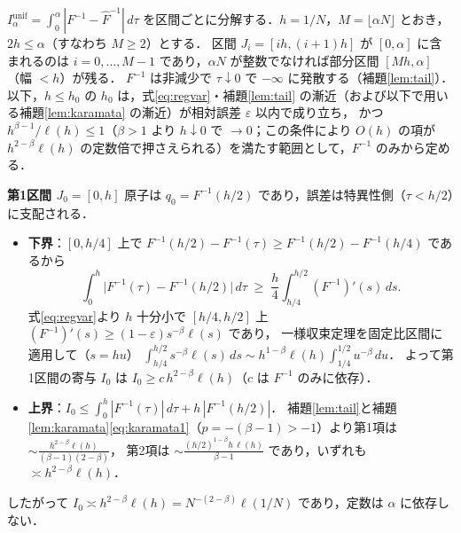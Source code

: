 \documentclass[a4paper,10pt]{jsarticle}
\makeatletter
\theoremstyle{definition}
\renewenvironment{proof}[1][\proofname]{\par
  \pushQED{\qed}%
  \normalfont \topsep6\p@\@plus6\p@\relax
  \trivlist
  \item[\hskip\labelsep\textbf{#1}]\ignorespaces
}{%
  \popQED\endtrivlist\@endpefalse
}
\renewcommand{\proofname}{証明}
\newcommand{\Finv}{F^{-1}}
\newcommand{\Fhinv}{\hat{F}^{-1}}
\newcommand{\Iunif}{I_\alpha^{\mathrm{unif}}}
\makeatother
\begin{document}
\begin{proof}
$\Iunif=\int_0^\alpha|\Finv-\Fhinv|\,d\tau$ を区間ごとに分解する．$h=1/N$，$M=\lfloor\alpha N\rfloor$ とおき，$2h\le\alpha$（すなわち $M\ge2$）とする．
区間 $J_i=[ih,(i+1)h]$ が $[0,\alpha]$ に含まれるのは $i=0,\dots,M-1$ であり，$\alpha N$ が整数でなければ部分区間 $[Mh,\alpha]$（幅 $<h$）が残る．
$\Finv$ は非減少で $\tau\downarrow0$ で $-\infty$ に発散する（補題\ref{lem:tail}）．
以下，$h\le h_0$ の $h_0$ は，式\eqref{eq:regvar}・補題\ref{lem:tail} の漸近（および以下で用いる補題\ref{lem:karamata} の漸近）が相対誤差 $\varepsilon$ 以内で成り立ち，
かつ $h^{\beta-1}/\ell(h)\le1$（$\beta>1$ より $h\downarrow0$ で $\to0$；この条件により $O(h)$ の項が $h^{2-\beta}\ell(h)$ の定数倍で押さえられる）を満たす範囲として，$\Finv$ のみから定める．

\noindent\textbf{第1区間 $J_0=[0,h]$}
原子は $q_0=\Finv(h/2)$ であり，誤差は特異性側（$\tau<h/2$）に支配される．
\begin{itemize}
\item \textbf{下界}：$[0,h/4]$ 上で $\Finv(h/2)-\Finv(\tau)\ge\Finv(h/2)-\Finv(h/4)$ であるから
\begin{equation*}
\int_0^{h}\bigl|\Finv(\tau)-\Finv(h/2)\bigr|\,d\tau
\;\ge\;\frac{h}{4}\int_{h/4}^{h/2}(\Finv)'(s)\,ds .
\end{equation*}
式\eqref{eq:regvar}より $h$ 十分小で $[h/4,h/2]$ 上 $(\Finv)'(s)\ge(1-\varepsilon)s^{-\beta}\ell(s)$ であり，
一様収束定理を固定比区間に適用して（$s=hu$）
$\int_{h/4}^{h/2}s^{-\beta}\ell(s)\,ds\sim h^{1-\beta}\ell(h)\int_{1/4}^{1/2}u^{-\beta}\,du$．
よって第1区間の寄与 $I_0$ は $I_0\ge c\,h^{2-\beta}\ell(h)$（$c$ は $\Finv$ のみに依存）．
\item \textbf{上界}：$I_0\le\int_0^h|\Finv(\tau)|\,d\tau+h\,|\Finv(h/2)|$．
補題\ref{lem:tail}と補題\ref{lem:karamata}\eqref{eq:karamata1}（$p=-(\beta-1)>-1$）より第1項は $\sim\frac{h^{2-\beta}\ell(h)}{(\beta-1)(2-\beta)}$，
第2項は $\sim\frac{(h/2)^{1-\beta}h\,\ell(h)}{\beta-1}$ であり，いずれも $\asymp h^{2-\beta}\ell(h)$．
\end{itemize}
したがって $I_0\asymp h^{2-\beta}\ell(h)=N^{-(2-\beta)}\ell(1/N)$ であり，定数は $\alpha$ に依存しない．


\end{proof}
\end{document}

